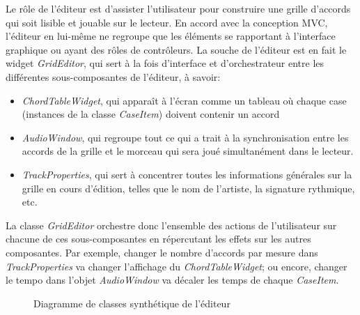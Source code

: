 \documentclass[a4paper,11pt]{article}
\begin{document}
Le rôle de l'éditeur est d'assister l'utilisateur pour construire une grille d'accords qui soit lisible et jouable sur le lecteur. En accord avec la conception MVC, l'éditeur en lui-même ne regroupe que les éléments se rapportant à l'interface graphique ou ayant des rôles de contrôleurs. La souche de l'éditeur est en fait le widget \textit{GridEditor}, qui sert à la fois d'interface et d'orchestrateur entre les différentes sous-composantes de l'éditeur, à savoir:
\begin{itemize}
 \item \textit{ChordTableWidget}, qui apparaît à l'écran comme un tableau où chaque case (instances de la classe \textit{CaseItem}) doivent contenir un accord
 \item \textit{AudioWindow}, qui regroupe tout ce qui a trait à la synchronisation entre les accords de la grille et le morceau qui sera joué simultanément dans le lecteur.
 \item \textit{TrackProperties}, qui sert à concentrer toutes les informations générales sur la grille en cours d'édition, telles que le nom de l'artiste, la signature rythmique, etc.
\end{itemize}

La classe \textit{GridEditor} orchestre donc l'ensemble des actions de l'utilisateur sur chacune de ces sous-composantes en répercutant les effets sur les autres composantes. Par exemple, changer le nombre d'accords par mesure dans \textit{TrackProperties} va changer l'affichage du \textit{ChordTableWidget}; ou encore, changer le tempo dans l'objet \textit{AudioWindow} va décaler les temps de chaque \textit{CaseItem}.


\begin{figure}[H]
\begin{center}
\caption{Diagramme de classes synthétique de l'éditeur}
\label{diag_editor}
\end{center}
\end{figure}
\end{document}
